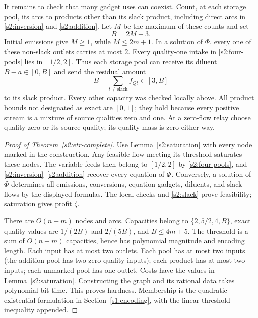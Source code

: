 It remains to check that many gadget uses can coexist. Count, at each
storage pool, its arcs to products other than its slack product, including
direct arcs in \eqref{s2:inversion} and \eqref{s2:addition}. Let $M$ be
the maximum of these counts and set
\begin{equation}
 B=2M+3.\label{s2:B}
\end{equation}
Initial emissions give $M\ge1$, while $M\le2m+1$. In a solution of
$\Phi$, every one of these non-slack outlets carries at most $2$.
Every quality-one intake in \eqref{s2:four-pools} lies in $[1/2,2]$.
Thus each storage pool can receive its diluent $B-a\in[0,B]$ and
send the residual amount
\begin{equation}
 B-\sum_{t\ne\mathrm{slack}}f_{Qt}\in[3,B]\label{s2:slack}
\end{equation}
to its slack product. Every other capacity was checked locally above.
All product bounds not designated as exact are $[0,1]$; they hold
because every positive stream is a mixture of source qualities zero
and one. At a zero-flow relay choose quality zero or its source quality;
its quality mass is zero either way.

\begin{proof}[Proof of Theorem~\ref{s2:etr-complete}]
Use Lemma~\ref{s2:saturation} with every node marked in the construction.
Any feasible flow meeting its threshold saturates these nodes.
The variable feeds then belong to $[1/2,2]$ by
\eqref{s2:four-pools}, and \eqref{s2:inversion}--\eqref{s2:addition}
recover every equation of $\Phi$. Conversely, a solution of $\Phi$
determines all emissions, conversions, equation gadgets, diluents,
and slack flows by the displayed formulas. The local checks and
\eqref{s2:slack} prove feasibility; saturation gives profit $\zeta$.

There are $O(n+m)$ nodes and arcs. Capacities belong to
$\{2,5/2,4,B\}$, exact quality values are $1/(2B)$ and $2/(5B)$,
and $B\le4m+5$. The threshold is a sum of $O(n+m)$ capacities, hence
has polynomial magnitude and encoding length. Each input has at most
two outlets. Each pool has at most two inputs (the addition pool has
two zero-quality inputs); each product has at most two inputs; each
unmarked pool has one outlet. Costs have the values in
Lemma~\ref{s2:saturation}. Constructing the graph and its rational
data takes polynomial bit time. This proves hardness. Membership is
the quadratic existential formulation in Section~\ref{s1:encoding},
with the linear threshold inequality appended.
\end{proof}

